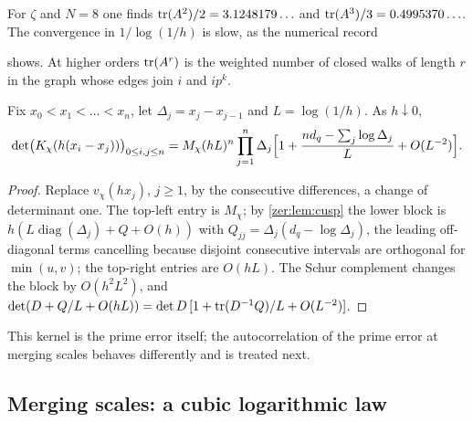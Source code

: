 For $\zeta$ and $N=8$ one finds $\operatorname{tr}(A^2)/2=3.1248179\ldots$ and
$\operatorname{tr}(A^3)/3=0.4995370\ldots$. The convergence in
$1/\log(1/h)$ is slow, as the numerical record
\begin{center}\end{center}
shows. At higher orders
$\operatorname{tr}(A^r)$ is the weighted number of closed walks of length $r$ in the graph whose edges join $i$
and $ip^k$.

\begin{theorem}\label{zer:thm:gramcoal}
Fix $x_0<x_1<\dots<x_n$, let $\Delta_j=x_j-x_{j-1}$ and $L=\log(1/h)$. As $h\downarrow0$,
\[
 \det\bigl(K_\chi(h(x_i-x_j))\bigr)_{0\le i,j\le n}
 =M_\chi(hL)^n\prod_{j=1}^n\Delta_j\Bigl[1+\frac{nd_q-\sum_j\log\Delta_j}L+O(L^{-2})\Bigr].
\]
\end{theorem}
\begin{proof}
Replace $v_\chi(hx_j)$, $j\ge1$, by the consecutive differences, a change of determinant one. The
top-left entry is $M_\chi$; by \cref{zer:lem:cusp} the lower block is
$h(L\operatorname{diag}(\Delta_j)+Q+O(h))$ with $Q_{jj}=\Delta_j(d_q-\log\Delta_j)$, the leading
off-diagonal terms cancelling because disjoint consecutive intervals are orthogonal for
$\min(u,v)$; the top-right entries are $O(hL)$. The Schur complement changes the block by
$O(h^2L^2)$, and $\det(D+Q/L+O(hL))=\det D\,[1+\operatorname{tr}(D^{-1}Q)/L+O(L^{-2})]$.
\end{proof}

This kernel is the prime error itself; the autocorrelation of the prime error at merging scales
behaves differently and is treated next.

\subsection{Merging scales: a cubic logarithmic law}\label{zer:sec:coalesce}

